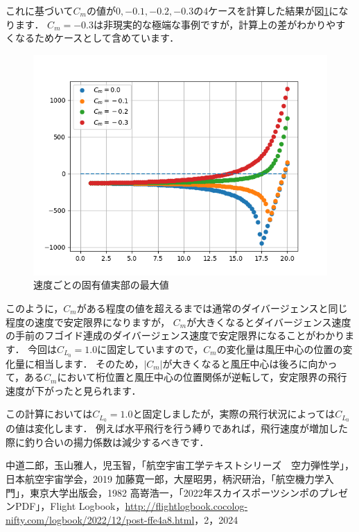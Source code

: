 \documentclass{jarticle}
\begin{document}
これに基づいて$C_m$の値が$0,-0.1,-0.2,-0.3$の4ケースを計算した結果が図\ref{eigen2}になります．
$C_m=-0.3$は非現実的な極端な事例ですが，計算上の差がわかりやすくなるためケースとして含めています．
\begin{figure}[H]
    \centering
    \includegraphics[width=0.7\linewidth]{image/eigenplot.png}
    \caption{速度ごとの固有値実部の最大値}
    \label{eigen2}
\end{figure}
このように，$C_m$がある程度の値を超えるまでは通常のダイバージェンスと同じ程度の速度で安定限界になりますが，
$C_m$が大きくなるとダイバージェンス速度の手前のフゴイド連成のダイバージェンス速度で安定限界になることがわかります．
今回は$C_{L_0}=1.0$に固定していますので，$C_m$の変化量は風圧中心の位置の変化量に相当します．
そのため，$|C_m|$が大きくなると風圧中心は後ろに向かって，ある$C_m$において桁位置と風圧中心の位置関係が逆転して，安定限界の飛行速度が下がったと見られます．

この計算においては$C_{L_0}=1.0$と固定しましたが，実際の飛行状況によっては$C_{L_0}$の値は変化します．
例えば水平飛行を行う縛りであれば，飛行速度が増加した際に釣り合いの揚力係数は減少するべきです．

\begin{thebibliography}{99}
     中道二郎，玉山雅人，児玉智，「航空宇宙工学テキストシリーズ　空力弾性学」，日本航空宇宙学会，2019
     加藤寛一郎，大屋昭男，柄沢研治，「航空機力学入門」，東京大学出版会，1982
     高嵜浩一，「2022年スカイスポーツシンポのプレゼンPDF」，Flight Logbook，\url{http://flightlogbook.cocolog-nifty.com/logbook/2022/12/post-ffe4a8.html}，2，2024
\end{thebibliography}
\end{document}
